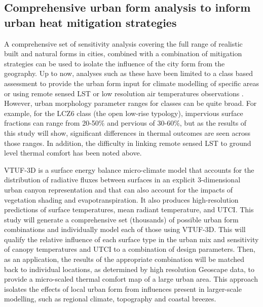 \documentclass[final,3p,times,authoryear]{elsarticle}
\begin{document}
\subsection{Comprehensive urban form analysis to inform urban heat mitigation strategies}

A comprehensive set of sensitivity analysis covering the full range of realistic built and natural forms in cities, combined with a combination of mitigation strategies can be used to isolate the influence of the city form from the geography. Up to now, analyses such as these have been limited to a class based assessment to provide the urban form input for climate modelling of specific areas \citep{stewart2014eval,Verdonck2018,Hammerberg2018,Masson2020,Emery2021} or using remote sensed LST \citep{Alexander2021,Li2022,Peng2022} or low resolution air temperatures observations \citep{Potgieter2021}. However, urban morphology parameter ranges for classes can be quite broad. For example, for the LCZ6 class (the open low-rise typology), impervious surface fractions can range from 20-50\% and pervious of 30-60\%, but as the results of this study will show, significant differences in thermal outcomes are seen across those ranges. In addition, the difficulty in linking remote sensed LST to ground level thermal comfort has been noted above.

VTUF-3D is a surface energy balance micro-climate model that accounts for the distribution of radiative fluxes between surfaces in an explicit 3-dimensional urban canyon representation and that can also account for the impacts of vegetation shading and evapotranspiration. It also produces high-resolution predictions of surface temperatures, mean radiant temperature, and UTCI. This study will generate a comprehensive set (thousands) of possible urban form combinations and individually model each of those using VTUF-3D. This will qualify the relative influence of each surface type in the urban mix and sensitivity of canopy temperatures and UTCI to a combination of design parameters. Then, as an application, the results of the appropriate combination will be matched back to individual locations, as determined by high resolution Geoscape data, to provide a micro-scaled thermal comfort map of a large urban area. This approach isolates the effects of local urban form from influences present in larger-scale modelling, such as regional climate, topography and coastal breezes.
\end{document}
